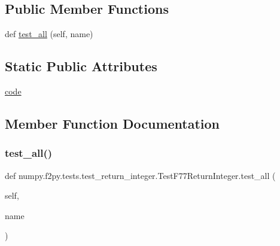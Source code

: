\subsection*{Public Member Functions}
\begin{DoxyCompactItemize}
\item 
def \hyperlink{classnumpy_1_1f2py_1_1tests_1_1test__return__integer_1_1TestF77ReturnInteger_a5e2afb88194aa8d91f4b22a9bc9a4448}{test\+\_\+all} (self, name)
\end{DoxyCompactItemize}
\subsection*{Static Public Attributes}
\begin{DoxyCompactItemize}
\item 
\hyperlink{classnumpy_1_1f2py_1_1tests_1_1test__return__integer_1_1TestF77ReturnInteger_af6d1785fbdf856e949d482537f8012be}{code}
\end{DoxyCompactItemize}


\subsection{Member Function Documentation}
\mbox{\label{classnumpy_1_1f2py_1_1tests_1_1test__return__integer_1_1TestF77ReturnInteger_a5e2afb88194aa8d91f4b22a9bc9a4448}} 
\subsubsection{\texorpdfstring{test\+\_\+all()}{test\_all()}}
{\footnotesize\ttfamily def numpy.\+f2py.\+tests.\+test\+\_\+return\+\_\+integer.\+Test\+F77\+Return\+Integer.\+test\+\_\+all (\begin{DoxyParamCaption}\item[{}]{self,  }\item[{}]{name }\end{DoxyParamCaption})}



